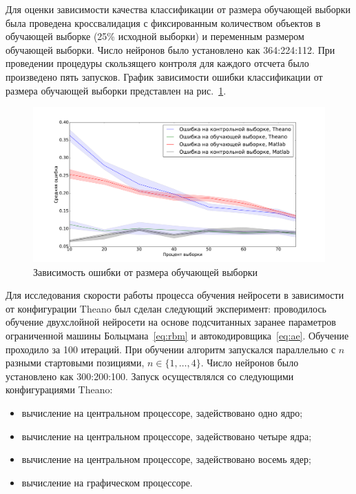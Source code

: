Для оценки зависимости качества классификации от размера обучающей выборки была проведена кроссвалидация с фиксированным количеством объектов в обучающей выборке (25\% исходной выборки) и переменным размером обучающей выборки. Число нейронов было установлено как 364:224:112. При проведении процедуры скользящего контроля для каждого отсчета было произведено пять запусков. График зависимости ошибки классификации от размера обучающей выборки представлен на рис.~\ref{fig:samples}.


\begin{figure}[tb!]
 \centering
  \includegraphics[width=1.0\textwidth]{plots/popova/samples.pdf}
 \caption{Зависимость ошибки от размера обучающей выборки}
 \label{fig:samples}
\end{figure}


Для исследования скорости работы процесса обучения нейросети в зависимости от конфигурации Theano был сделан следующий эксперимент:
проводилось обучение двухслойной нейросети на основе подсчитанных заранее параметров ограниченной машины Больцмана~\eqref{eq:rbm} и автокодировщика~\eqref{eq:ae}. Обучение проходило за 100 итераций. При обучении алгоритм запускался параллельно с $n$ разными стартовыми позициями, $n \in \{1,\dots,4\}.$ Число нейронов было установлено как 300:200:100.
Запуск осуществлялся со следующими конфигурациями Theano:
\begin{itemize}
\item вычисление на центральном процессоре, задействовано
одно ядро;
\item вычисление на центральном процессоре, задействовано четыре ядра;
\item вычисление на центральном процессоре, задействовано восемь ядер;
\item вычисление на графическом процессоре.
\end{itemize}

